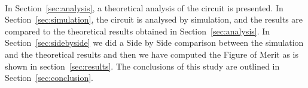 \paragraph{}

In Section~\ref{sec:analysis}, a theoretical analysis of the circuit is
presented. In Section~\ref{sec:simulation}, the circuit is analysed by
simulation, and the results are compared to the theoretical results obtained in
Section~\ref{sec:analysis}. 
In Section~\ref{sec:sidebyside} we did a Side by Side comparison between the simulation and the theoretical results and then we have computed the Figure of Merit as is shown in section~\ref{sec:results}.
The conclusions of this study are outlined in Section~\ref{sec:conclusion}.



